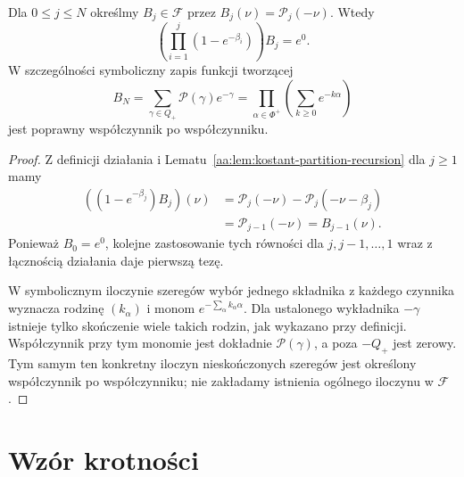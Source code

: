 \begin{lemat}
\label{aa:lem:kostant-generating}
Dla $0\le j\le N$ określmy $B_j\in\mathcal F$ przez $B_j(\nu)=\mathcal P_j(-\nu)$. Wtedy
\[
 \left(\prod_{i=1}^j(1-e^{-\beta_i})\right)B_j=e^0.
\]
W szczególności symboliczny zapis funkcji tworzącej
\[
 B_N=\sum_{\gamma\in Q_+}\mathcal P(\gamma)e^{-\gamma}
     =\prod_{\alpha\in\Phi^+}\left(\sum_{k\ge0}e^{-k\alpha}\right)
\]
jest poprawny współczynnik po współczynniku.
\end{lemat}
\begin{proof}
Z definicji działania i Lematu~\ref{aa:lem:kostant-partition-recursion} dla $j\ge1$ mamy
\[
 \begin{aligned}
 ((1-e^{-\beta_j})B_j)(\nu)
 &=\mathcal P_j(-\nu)-\mathcal P_j(-\nu-\beta_j)\\
 &=\mathcal P_{j-1}(-\nu)=B_{j-1}(\nu).
 \end{aligned}
\]
Ponieważ $B_0=e^0$, kolejne zastosowanie tych równości dla $j,j-1,\ldots,1$ wraz z łącznością działania daje pierwszą tezę.

W symbolicznym iloczynie szeregów wybór jednego składnika z każdego czynnika wyznacza rodzinę $(k_\alpha)$ i monom $e^{-\sum_\alpha k_\alpha\alpha}$. Dla ustalonego wykładnika $-\gamma$ istnieje tylko skończenie wiele takich rodzin, jak wykazano przy definicji. Współczynnik przy tym monomie jest dokładnie $\mathcal P(\gamma)$, a poza $-Q_+$ jest zerowy. Tym samym ten konkretny iloczyn nieskończonych szeregów jest określony współczynnik po współczynniku; nie zakładamy istnienia ogólnego iloczynu w $\mathcal F$.
\end{proof}

\section{Wzór krotności}

